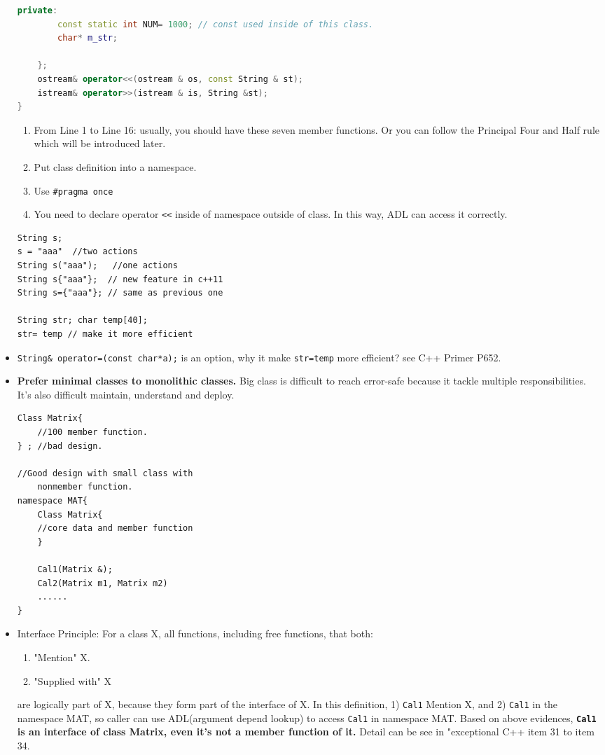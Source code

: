 \documentclass[a4paper,11pt,twoside]{book}
\begin{document}
\begin{itemize}
\begin{lstlisting}[frame=single, language=c++]
	private:
		const static int NUM= 1000; // const used inside of this class.
		char* m_str;
		
	};
	ostream& operator<<(ostream & os, const String & st);
	istream& operator>>(istream & is, String &st);
}
\end{lstlisting}
	
	\begin{enumerate}
		\item From Line 1 to Line 16: usually, you should have these seven member functions. Or you can follow the Principal Four and Half rule which will be introduced later. 
		\item Put class definition into a namespace.
		\item Use \texttt{\#pragma once}
		\item You need to declare operator \verb=<<= inside of namespace outside of class. In this way, ADL can access it correctly.
	\end{enumerate}
	
	
\begin{lstlisting}[numbers=none]
String s;
s = "aaa"  //two actions
String s("aaa");   //one actions
String s{"aaa"};  // new feature in c++11
String s={"aaa"}; // same as previous one
	
String str; char temp[40];
str= temp // make it more efficient
\end{lstlisting}
	
        \item \texttt{String\& operator=(const char*a);} is an option, why it make \texttt{str=temp} more efficient? see C++ Primer P652.
	
		\item \textbf{Prefer minimal classes to monolithic classes.} Big class is difficult to reach error-safe because it tackle multiple responsibilities. It's also difficult maintain, understand and deploy.
\begin{lstlisting}[numbers=none]
Class Matrix{
	//100 member function.
} ; //bad design.
	
//Good design with small class with
	nonmember function.
namespace MAT{
	Class Matrix{
	//core data and member function
	}
	
	Cal1(Matrix &);
	Cal2(Matrix m1, Matrix m2)
	......
}
\end{lstlisting}

	\item Interface Principle: For a class X, all functions, including free functions, that both:
	\begin{enumerate}
		\item "Mention" X.
		\item "Supplied with" X
	\end{enumerate}
	are logically part of X, because they form part of the interface of X.  In this definition, 1) \texttt{Cal1} Mention X,  and 2) \texttt{Cal1} in the namespace MAT, so caller can use ADL(argument depend lookup) to access \texttt{Cal1} in namespace MAT. Based on above evidences, \textbf{\texttt{Cal1} is an interface of class Matrix, even it's not a member function of it.} Detail can be see in "exceptional C++ item 31 to item 34.
	

\end{itemize}
\end{document}
